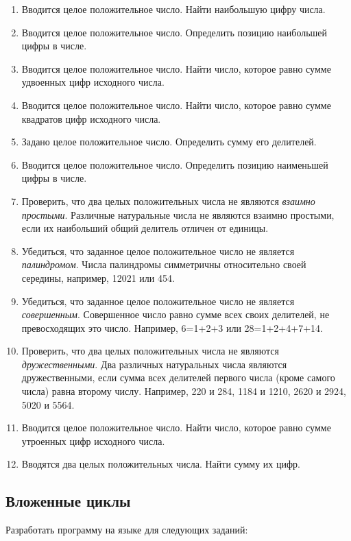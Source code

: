 \begin{enumerate}
\item Вводится целое положительное число. Найти наибольшую цифру числа.
\item Вводится целое положительное число. Определить позицию наибольшей цифры в числе.
\item Вводится целое положительное число. Найти число, которое равно сумме удвоенных цифр исходного числа.
\item Вводится целое положительное число. Найти число, которое равно сумме квадратов цифр исходного числа.
\item Задано целое положительное число. Определить сумму его делителей.
\item Вводится целое положительное число. Определить позицию наименьшей цифры в числе.
\item Проверить, что два целых положительных числа не являются \emph{взаимно простыми}. Различные
натуральные числа не являются взаимно простыми, если их наибольший общий делитель отличен от единицы.
\item Убедиться, что заданное целое положительное число не является \emph{палиндромом}. Числа палиндромы
симметричны относительно своей середины, например, 12021 или 454.
\item Убедиться, что заданное целое положительное число не является \emph{совершенным}. Совершенное число
равно сумме всех своих делителей, не превосходящих это число. Например, 6=1+2+3 или 28=1+2+4+7+14.
\item Проверить, что два целых положительных числа не являются \emph{дружественными}. Два различных
натуральных числа являются дружественными, если сумма всех делителей первого числа (кроме самого числа) равна второму
числу. Например, 220 и 284, 1184 и 1210, 2620 и 2924, 5020 и 5564.
\item Вводится целое положительное число. Найти число, которое равно сумме утроенных цифр исходного числа.
\item Вводятся два целых положительных числа. Найти сумму их цифр. 
\end{enumerate}

\subsection[Вложенные циклы]{Вложенные циклы}
Разработать программу на языке  для следующих заданий:


